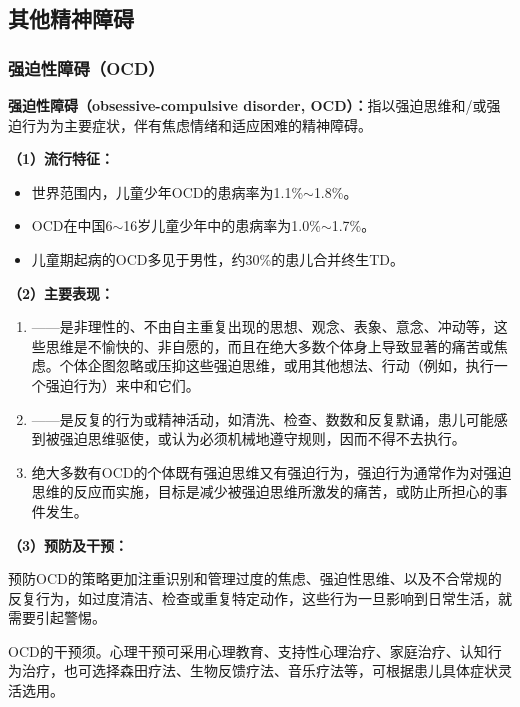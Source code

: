 \subsection{其他精神障碍}

\subsubsection{强迫性障碍（OCD）}

\begin{keybox}
\textbf{强迫性障碍（obsessive-compulsive disorder, OCD）：}指以强迫思维和/或强迫行为为主要症状，伴有焦虑情绪和适应困难的精神障碍。

\vspace{4pt}
\textbf{（1）流行特征：}

\begin{itemize}[leftmargin=*]
    \item 世界范围内，儿童少年OCD的患病率为1.1\%$\sim$1.8\%。
    \item OCD在中国6$\sim$16岁儿童少年中的患病率为1.0\%$\sim$1.7\%。
    \item 儿童期起病的OCD多见于男性，约30\%的患儿合并终生TD。
\end{itemize}

\vspace{4pt}
\textbf{（2）主要表现：}

\begin{enumerate}[leftmargin=*]
    \item {}——是非理性的、不由自主重复出现的思想、观念、表象、意念、冲动等，这些思维是不愉快的、非自愿的，而且在绝大多数个体身上导致显著的痛苦或焦虑。个体企图忽略或压抑这些强迫思维，或用其他想法、行动（例如，执行一个强迫行为）来中和它们。

    \item {}——是反复的行为或精神活动，如清洗、检查、数数和反复默诵，患儿可能感到被强迫思维驱使，或认为必须机械地遵守规则，因而不得不去执行。

    \item 绝大多数有OCD的个体既有强迫思维又有强迫行为，强迫行为通常作为对强迫思维的反应而实施，目标是减少被强迫思维所激发的痛苦，或防止所担心的事件发生。
\end{enumerate}

\vspace{4pt}
\textbf{（3）预防及干预：}

预防OCD的策略更加注重识别和管理过度的焦虑、强迫性思维、以及不合常规的反复行为，如过度清洁、检查或重复特定动作，这些行为一旦影响到日常生活，就需要引起警惕。

OCD的干预须。心理干预可采用心理教育、支持性心理治疗、家庭治疗、认知行为治疗，也可选择森田疗法、生物反馈疗法、音乐疗法等，可根据患儿具体症状灵活选用。
\end{keybox}

